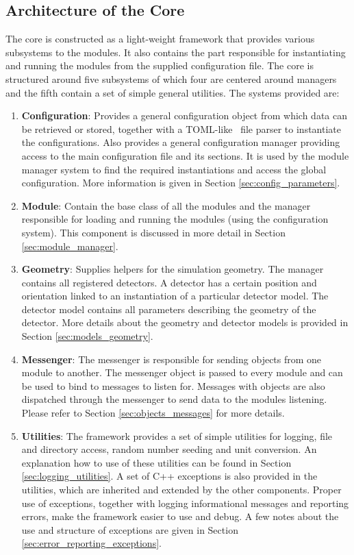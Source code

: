 \subsection{Architecture of the Core}
The core is constructed as a light-weight framework that provides various subsystems to the modules. It also contains the part responsible for instantiating and running the modules from the supplied configuration file. The core is structured around five subsystems of which four are centered around managers and the fifth contain a set of simple general utilities. The systems provided are:
\begin{enumerate}
\item \textbf{Configuration}: Provides a general configuration object from which data can be retrieved or stored, together with a TOML-like~\cite{tomlgit} file parser to instantiate the configurations. Also provides a general \apsq configuration manager providing access to the main configuration file and its sections. It is used by the module manager system to find the required instantiations and access the global configuration. More information is given in Section \ref{sec:config_parameters}.
\item \textbf{Module}: Contain the base class of all the \apsq modules and the manager responsible for loading and running the modules (using the configuration system). This component is discussed in more detail in Section \ref{sec:module_manager}.
\item \textbf{Geometry}: Supplies helpers for the simulation geometry. The manager contains all registered detectors. A detector has a certain position and orientation linked to an instantiation of a particular detector model. The detector model contains all parameters describing the geometry of the detector. More details about the geometry and detector models is provided in Section \ref{sec:models_geometry}.
\item \textbf{Messenger}: The messenger is responsible for sending objects from one module to another. The messenger object is passed to every module and can be used to bind to messages to listen for. Messages with objects are also dispatched through the messenger to send data to the modules listening. Please refer to Section \ref{sec:objects_messages} for more details.
\item \textbf{Utilities}: The framework provides a set of simple utilities for logging, file and directory access, random number seeding and unit conversion. An explanation how to use of these utilities can be found in Section \ref{sec:logging_utilities}. A set of C++ exceptions is also provided in the utilities, which are inherited and extended by the other components. Proper use of exceptions, together with logging informational messages and reporting errors, make the framework easier to use and debug. A few notes about the use and structure of exceptions are given in Section \ref{sec:error_reporting_exceptions}.
\end{enumerate}

